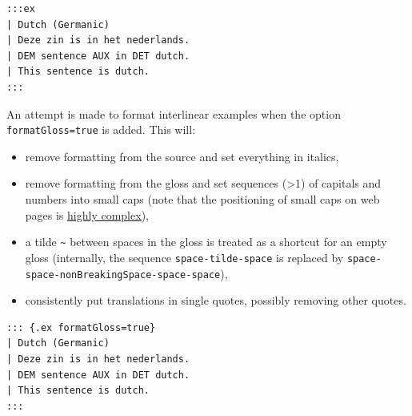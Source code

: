 \documentclass[
]{article}
\providecommand{\tightlist}{%
  \setlength{\itemsep}{0pt}\setlength{\parskip}{0pt}}
\begin{document}
\begin{verbatim}
:::ex
| Dutch (Germanic)
| Deze zin is in het nederlands.
| DEM sentence AUX in DET dutch.
| This sentence is dutch.
:::
\end{verbatim}

\begin{samepage}
\begin{exe} \judgewidth{}
  \label{ex:4.9}
\end{exe}
\end{samepage}

An attempt is made to format interlinear examples when the option
\texttt{formatGloss=true} is added. This will:

\begin{itemize}
\tightlist
\item
  remove formatting from the source and set everything in italics,
\item
  remove formatting from the gloss and set sequences (\textgreater1) of
  capitals and numbers into small caps (note that the positioning of
  small caps on web pages is
  \href{https://iamvdo.me/en/blog/css-font-metrics-line-height-and-vertical-align}{highly
  complex}),
\item
  a tilde \texttt{\textasciitilde{}} between spaces in the gloss is
  treated as a shortcut for an empty gloss (internally, the sequence
  \texttt{space-tilde-space} is replaced by
  \texttt{space-space-nonBreakingSpace-space-space}),
\item
  consistently put translations in single quotes, possibly removing
  other quotes.
\end{itemize}

\begin{verbatim}
::: {.ex formatGloss=true}
| Dutch (Germanic)
| Deze zin is in het nederlands.
| DEM sentence AUX in DET dutch.
| This sentence is dutch.
:::
\end{verbatim}

\begin{samepage}
\begin{exe} \judgewidth{}
  \label{ex:4.10}
\end{exe}
\end{samepage}
\end{document}
